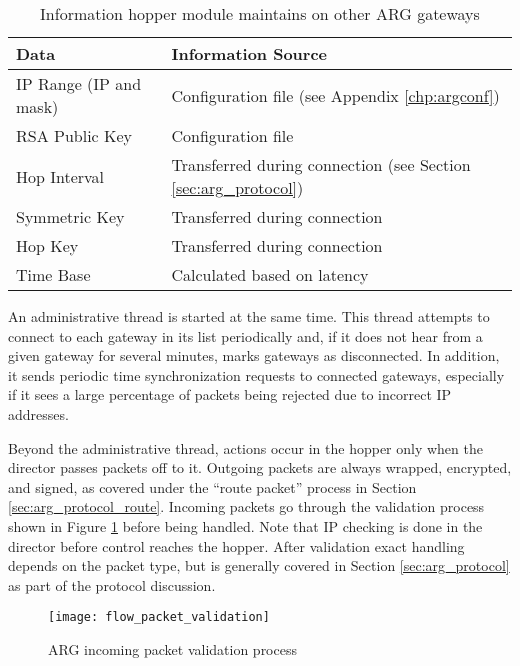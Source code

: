 \begin{table}
\caption{Information hopper module maintains on other \ac{ARG} gateways}
\label{tab:gatestate}
\centering
\begin{tabular}{l|l}
	\textbf{Data} & \textbf{Information Source}\\
	\hline
	IP Range (IP and mask) & Configuration file (see Appendix \ref{chp:argconf})\\
	\ac{RSA} Public Key & Configuration file\\
	Hop Interval & Transferred during connection (see Section \ref{sec:arg_protocol})\\
	Symmetric Key & Transferred during connection\\
	Hop Key & Transferred during connection\\
	Time Base & Calculated based on latency\\
\end{tabular}
\end{table}

\par An administrative thread is started at the same time. This thread attempts to connect to each gateway in its list periodically and, if it does not hear from a given gateway for several minutes, marks gateways as disconnected. In addition, it sends periodic time synchronization requests to connected gateways, especially if it sees a large percentage of packets being rejected due to incorrect \ac{IP} addresses. 

\par Beyond the administrative thread, actions occur in the hopper only when the director passes packets off to it. Outgoing packets are always wrapped, encrypted, and signed, as covered under the ``route packet'' process in Section \ref{sec:arg_protocol_route}. Incoming packets go through the validation process shown in Figure \ref{fig:arg_hopper_in_validation} before being handled. Note that \ac{IP} checking is done in the director before control reaches the hopper. After validation exact handling depends on the packet type, but is generally covered in Section \ref{sec:arg_protocol} as part of the protocol discussion.

\begin{figure}
\caption{\ac{ARG} incoming packet validation process}
\label{fig:arg_hopper_in_validation}
\centering
\texttt{[image: flow\_packet\_validation]}
\end{figure}

